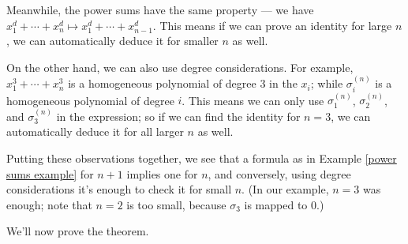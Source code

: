 Meanwhile, the power sums have the same property --- we have $x_1^d + \cdots + x_n^d \mapsto x_1^d + \cdots + x_{n - 1}^d$. This means if we can prove an identity for large $n$, we can automatically deduce it for smaller $n$ as well. 

On the other hand, we can also use degree considerations. For example, $x_1^3 + \cdots + x_n^3$ is a homogeneous polynomial of degree $3$ in the $x_i$; while $\sigma_i^{(n)}$ is a homogeneous polynomial of degree $i$. This means we can only use $\sigma_1^{(n)}$, $\sigma_2^{(n)}$, and $\sigma_3^{(n)}$ in the expression; so if we can find the identity for $n = 3$, we can automatically deduce it for all larger $n$ as well. 

Putting these observations together, we see that a formula as in Example \ref{power sums example} for $n + 1$ implies one for $n$, and conversely, using degree considerations it's enough to check it for small $n$. (In our example, $n = 3$ was enough; note that $n = 2$ is too small, because $\sigma_3$ is mapped to $0$.)

We'll now prove the theorem. 

